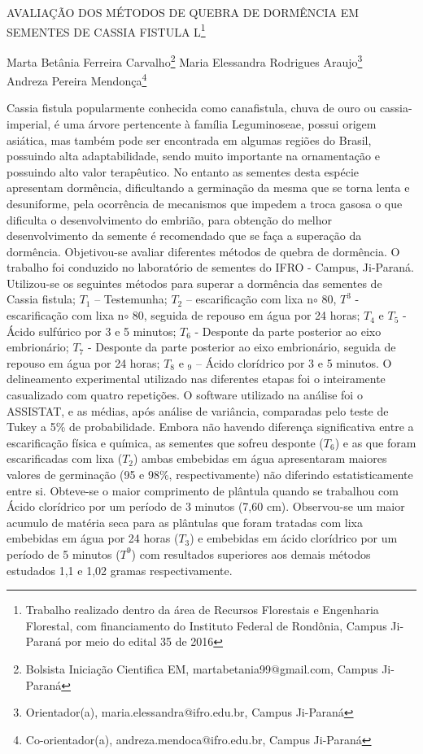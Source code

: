 \documentclass[article,12pt,onesidea,4paper,english,brazil]{abntex2}
\begin{document}
	
	
	\frenchspacing 
	
	\begin{center}
		\LARGE AVALIAÇÃO DOS MÉTODOS DE QUEBRA DE DORMÊNCIA EM SEMENTES DE \MakeUppercase{Cassia fistula} L\footnote{Trabalho realizado dentro da área de Recursos Florestais e Engenharia Florestal, com financiamento do Instituto Federal de Rondônia, Campus Ji-Paraná por meio do edital 35 de 2016}
		
		\normalsize
	Marta Betânia Ferreira Carvalho\footnote{Bolsista Iniciação Cientifica EM, martabetania99@gmail.com, Campus Ji-Paraná} 
		Maria Elessandra Rodrigues Araujo\footnote{Orientador(a), maria.elessandra@ifro.edu.br, Campus Ji-Paraná} \\
		Andreza Pereira Mendonça\footnote{Co-orientador(a), andreza.mendoca@ifro.edu.br, Campus Ji-Paraná} 
	
	\end{center}
	
	\noindent 
	Cassia fistula popularmente conhecida como canafistula, chuva de ouro ou cassia-imperial, é uma árvore pertencente à família Leguminoseae, possui origem asiática, mas também pode ser encontrada em algumas regiões do Brasil, possuindo alta adaptabilidade, sendo muito importante na ornamentação e possuindo alto valor terapêutico. No entanto as sementes desta espécie apresentam dormência, dificultando a germinação da mesma que se torna lenta e desuniforme, pela ocorrência de mecanismos que impedem a troca gasosa o que dificulta o desenvolvimento do embrião, para obtenção do melhor desenvolvimento da semente é recomendado que se faça a superação da dormência. Objetivou-se avaliar diferentes métodos de quebra de dormência. O trabalho foi conduzido no laboratório de sementes do IFRO - Campus, Ji-Paraná. Utilizou-se os seguintes métodos para superar a dormência das sementes de Cassia fistula; $T_1$ – Testemunha; $T_2$ – escarificação com lixa n$\circ$ 80, $T^3$ - escarificação com lixa n$\circ$ 80, seguida de repouso em água por 24 horas; $T_4$ e $T_5$ - Ácido sulfúrico por 3 e 5 minutos; $T_6$ - Desponte da parte posterior ao eixo embrionário; $T_7$ - Desponte da parte posterior ao eixo embrionário, seguida de repouso em água por 24 horas; $T_8$ e $_9$ – Ácido clorídrico por 3 e 5 minutos. O delineamento experimental utilizado nas diferentes etapas foi o inteiramente casualizado com quatro repetições. O software utilizado na análise foi o ASSISTAT, e as médias, após análise de variância, comparadas pelo teste de Tukey a 5\% de probabilidade. Embora não havendo diferença significativa entre a escarificação física e química, as sementes que sofreu desponte ($T_6$) e as que foram escarificadas com lixa ($T_2$) ambas embebidas em água apresentaram maiores valores de germinação (95 e 98\%, respectivamente) não diferindo estatisticamente entre si. Obteve-se o maior comprimento de plântula quando se trabalhou com Ácido clorídrico por um período de 3 minutos (7,60 cm). Observou-se um maior acumulo de matéria seca para as plântulas que foram tratadas com lixa embebidas em água por 24 horas ($T_3$) e embebidas em ácido clorídrico por um período de 5 minutos ($T^9$) com resultados superiores aos demais métodos estudados 1,1 e 1,02 gramas respectivamente.
	
\end{document}
